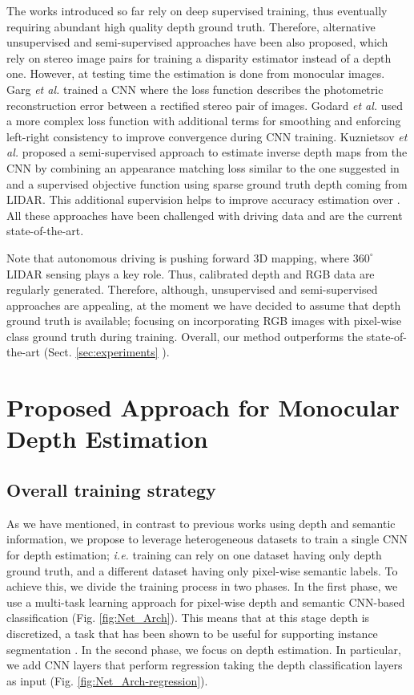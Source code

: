 \documentclass[letterpaper, 10 pt, conference]{ieeeconf}
\newcommand{\ie}{{\em i.e.}}
\newcommand{\etal}{{\em et al.}}
\newcommand{\Fig}[1]{Fig. \ref{fig:#1}}
\newcommand{\Sect}[1]{Sect. \ref{sec:#1}}
\begin{document}
The works introduced so far rely on deep supervised training, thus eventually requiring abundant high quality depth ground truth. Therefore, alternative unsupervised and semi-supervised approaches have been also proposed, which rely on stereo image pairs for training a disparity estimator instead of a depth one. However, at testing time the estimation is done from monocular images. Garg {\etal} \cite{Garg:2016} trained a CNN where the loss function describes the photometric reconstruction error between a rectified stereo pair of images. Godard {\etal} \cite{Godard:2017} used a more complex loss function with additional terms for smoothing and enforcing left-right consistency to improve convergence during CNN training. Kuznietsov {\etal} \cite{Kuznietsov:2017} proposed a semi-supervised approach to estimate inverse depth maps from the CNN by combining an appearance matching loss similar to the one suggested in \cite{Godard:2017} and a supervised objective function using sparse ground truth depth coming from LIDAR. This additional supervision helps to improve accuracy estimation over \cite{Godard:2017}. All these approaches have been challenged with driving data and are the current state-of-the-art.

Note that autonomous driving is pushing forward 3D mapping, where $360^\circ$ LIDAR sensing plays a key role. Thus, calibrated depth and RGB data are regularly generated. Therefore, although, unsupervised and semi-supervised approaches are appealing, at the moment we have decided to assume that depth ground truth is available; focusing on incorporating RGB images with pixel-wise class ground truth during training. Overall, our method outperforms the state-of-the-art (\Sect{experiments} ). 






 
\section{Proposed Approach for Monocular Depth Estimation}
\label{sec:method}

\subsection{Overall training strategy}

As we have mentioned, in contrast to previous works using depth and semantic information, we propose to leverage heterogeneous datasets to train a single CNN for depth estimation; {\ie} training can rely on one dataset having only depth ground truth, and a different dataset having only pixel-wise semantic labels. To achieve this, we divide the training process in two phases. In the first phase, we use a multi-task learning approach for pixel-wise depth and semantic CNN-based classification (\Fig{Net_Arch}). This means that at this stage depth is discretized, a task that has been shown to be useful for supporting instance segmentation \cite{Uhrig:2016}. In the second phase, we focus on depth estimation. In particular, we add CNN layers that perform regression taking the depth classification layers as input (\Fig{Net_Arch-regression}). 
\end{document}
